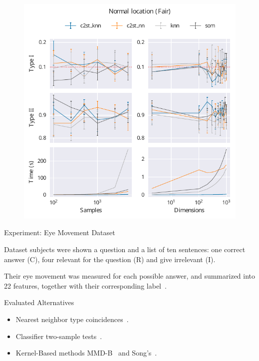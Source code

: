 \documentclass[10pt]{beamer}
\begin{document}
\begin{frame}{}
\begin{figure}
    \centering
    \includegraphics[height=\textheight]{normal_location_fair}
\end{figure}
\end{frame}

\begin{frame}{Experiment: Eye Movement Dataset}
    \begin{block}{Dataset}
         subjects were shown a question and a list of ten 
        sentences: one correct answer (C), four relevant for the question (R) and give irrelevant (I).
        
        Their eye movement was measured for each possible answer, and summarized into 22 features,
        together with their corresponding label~\cite{salojarvi2005inferring}.
    \end{block}
    \begin{block}{Evaluated Alternatives}
        \smallskip
        \begin{itemize}
            \item Nearest neighbor type coincidences~\cite{Henze1988, Schilling1986b}.
            \item Classifier two-sample tests~\cite{lopez2016revisiting}.
            \item Kernel-Based methods MMD-B~\cite{zaremba2013b} and Song's~\cite{song2021fast}.
        \end{itemize}
    \end{block}
\end{frame}
\end{document}
